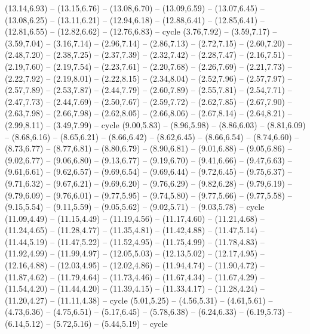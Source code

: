 \expandafter\def\csname geo:gebiet:VT\endcsname{
  (13.14,6.93) -- (13.15,6.76) -- (13.08,6.70) -- (13.09,6.59) -- (13.07,6.45) -- (13.08,6.25) -- (13.11,6.21) -- (12.94,6.18) -- (12.88,6.41) -- (12.85,6.41) -- (12.81,6.55) -- (12.82,6.62) -- (12.76,6.83) -- cycle}
\expandafter\def\csname geo:gebiet:WA\endcsname{
  (3.76,7.92) -- (3.59,7.17) -- (3.59,7.04) -- (3.16,7.14) -- (2.96,7.14) -- (2.86,7.13) -- (2.72,7.15) -- (2.60,7.20) -- (2.48,7.20) -- (2.38,7.25) -- (2.37,7.39) -- (2.32,7.42) -- (2.28,7.47) -- (2.16,7.51) -- (2.19,7.60) -- (2.19,7.54) -- (2.23,7.61) -- (2.20,7.68) -- (2.26,7.69) -- (2.21,7.73) -- (2.22,7.92) -- (2.19,8.01) -- (2.22,8.15) -- (2.34,8.04) -- (2.52,7.96) -- (2.57,7.97) -- (2.57,7.89) -- (2.53,7.87) -- (2.44,7.79) -- (2.60,7.89) -- (2.55,7.81) -- (2.54,7.71) -- (2.47,7.73) -- (2.44,7.69) -- (2.50,7.67) -- (2.59,7.72) -- (2.62,7.85) -- (2.67,7.90) -- (2.63,7.98) -- (2.66,7.98) -- (2.62,8.05) -- (2.66,8.06) -- (2.67,8.14) -- (2.64,8.21) -- (2.99,8.11) -- (3.49,7.99) -- cycle}
\expandafter\def\csname geo:gebiet:WI\endcsname{
  (9.00,5.83) -- (8.96,5.98) -- (8.86,6.03) -- (8.81,6.09) -- (8.68,6.16) -- (8.65,6.21) -- (8.66,6.42) -- (8.62,6.45) -- (8.66,6.54) -- (8.74,6.60) -- (8.73,6.77) -- (8.77,6.81) -- (8.80,6.79) -- (8.90,6.81) -- (9.01,6.88) -- (9.05,6.86) -- (9.02,6.77) -- (9.06,6.80) -- (9.13,6.77) -- (9.19,6.70) -- (9.41,6.66) -- (9.47,6.63) -- (9.61,6.61) -- (9.62,6.57) -- (9.69,6.54) -- (9.69,6.44) -- (9.72,6.45) -- (9.75,6.37) -- (9.71,6.32) -- (9.67,6.21) -- (9.69,6.20) -- (9.76,6.29) -- (9.82,6.28) -- (9.79,6.19) -- (9.79,6.09) -- (9.76,6.01) -- (9.77,5.95) -- (9.74,5.80) -- (9.77,5.66) -- (9.77,5.58) -- (9.15,5.54) -- (9.11,5.59) -- (9.05,5.62) -- (9.02,5.71) -- (9.03,5.78) -- cycle}
\expandafter\def\csname geo:gebiet:WV\endcsname{
  (11.09,4.49) -- (11.15,4.49) -- (11.19,4.56) -- (11.17,4.60) -- (11.21,4.68) -- (11.24,4.65) -- (11.28,4.77) -- (11.35,4.81) -- (11.42,4.88) -- (11.47,5.14) -- (11.44,5.19) -- (11.47,5.22) -- (11.52,4.95) -- (11.75,4.99) -- (11.78,4.83) -- (11.92,4.99) -- (11.99,4.97) -- (12.05,5.03) -- (12.13,5.02) -- (12.17,4.95) -- (12.16,4.88) -- (12.03,4.95) -- (12.02,4.86) -- (11.94,4.74) -- (11.90,4.72) -- (11.87,4.62) -- (11.79,4.64) -- (11.73,4.46) -- (11.67,4.34) -- (11.67,4.29) -- (11.54,4.20) -- (11.44,4.20) -- (11.39,4.15) -- (11.33,4.17) -- (11.28,4.24) -- (11.20,4.27) -- (11.11,4.38) -- cycle}
\expandafter\def\csname geo:gebiet:WY\endcsname{
  (5.01,5.25) -- (4.56,5.31) -- (4.61,5.61) -- (4.73,6.36) -- (4.75,6.51) -- (5.17,6.45) -- (5.78,6.38) -- (6.24,6.33) -- (6.19,5.73) -- (6.14,5.12) -- (5.72,5.16) -- (5.44,5.19) -- cycle}

